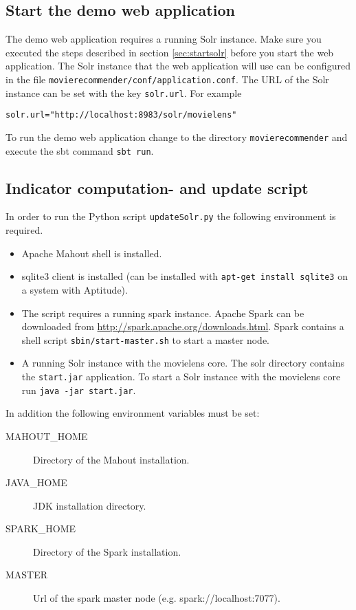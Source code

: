 \subsection{Start the demo web application}

The demo web application requires a running Solr instance. Make sure you executed the steps described in section \ref{sec:startsolr} before you start the web application. The Solr instance that the web application will use can be configured in the file \verb|movierecommender/conf/application.conf|. The URL of the Solr instance can be set with the key \verb|solr.url|. For example
\begin{verbatim}
solr.url="http://localhost:8983/solr/movielens"
\end{verbatim}

To run the demo web application change to the directory \verb|movierecommender| and execute the sbt command \verb|sbt run|.

\subsection{Indicator computation- and update script}
In order to run the Python script \verb|updateSolr.py| the following environment is required.
\begin{itemize}
\item Apache Mahout shell is installed.
\item sqlite3 client is installed (can be installed with \verb|apt-get install sqlite3| on a system with Aptitude). 
\item The script requires a running spark instance. Apache Spark can be downloaded from \url{http://spark.apache.org/downloads.html}. Spark contains a shell script \verb|sbin/start-master.sh| to start a master node.
\item A running Solr instance with the movielens core. The solr directory contains the \verb|start.jar| application. To start a Solr instance with the movielens core run \verb|java -jar start.jar|.
\end{itemize}

In addition the following environment variables must be set:
\begin{description}
\item[MAHOUT\_HOME] Directory of the Mahout installation.
\item[JAVA\_HOME] JDK installation directory.
\item[SPARK\_HOME] Directory of the Spark installation.
\item[MASTER] Url of the spark master node (e.g. spark://localhost:7077).
\end{description}

